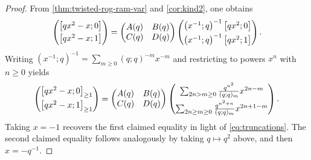 \documentclass[reqno,11pt]{amsart}
\theoremstyle{definition}
\theoremstyle{remark}
\numberwithin{equation}{section}
\newcommand{\vect}[2]{\big[{#1};{#2}\big]}
\begin{document}

\begin{proof}
From \cref{thm:twisted-rog-ram-var} and \cref{cor:kind2}, one obtains
\[
    \begin{pmatrix}
    \vect{qx^2-x}{0} \vspace{0.1cm}\\
    \vect{qx^2-x}{1}
    \end{pmatrix}
    =
    \begin{pmatrix}
    A(q) & B(q) \\
    C(q) & D(q)
    \end{pmatrix}
    \begin{pmatrix}
    \left(x^{-1}; q\right)^{-1} \vect{qx^2}{0}
    \vspace{0.1cm}\\
    \left(x^{-1}; q\right)^{-1} \vect{qx^2}{1}
    \end{pmatrix}.
\]
Writing $\left(x^{-1}; q\right)^{-1} = \sum_{m \ge 0} (q; q)^{-m} x^{-m}$ and restricting to powers $x^n$ with $n \ge 0$ yields
\[
    \begin{pmatrix}
    \vect{qx^2-x}{0}_{\ge 1} \vspace{0.1cm}\\
    \vect{qx^2-x}{1}_{\ge 1}
    \end{pmatrix}
    =
    \begin{pmatrix}
    A(q) & B(q) \\
    C(q) & D(q)
    \end{pmatrix}
    \begin{pmatrix}
    \sum_{2n > m \ge 0} \frac{q^{n^2}}{(q; q)_m} x^{2n-m} 
    \vspace{0.1cm} \\ 
    \sum_{2n\ge m \ge 0} \frac{q^{n^2+n}}{(q; q)_m} x^{2n+1-m} 
    \end{pmatrix}.
\]
Taking $x = -1$ recovers the first claimed equality in light of \cref{eq:truncations}. The second claimed equality follows analogously by taking $q \mapsto q^2$ above, and then $x = -q^{-1}$.
\end{proof}
\end{document}
